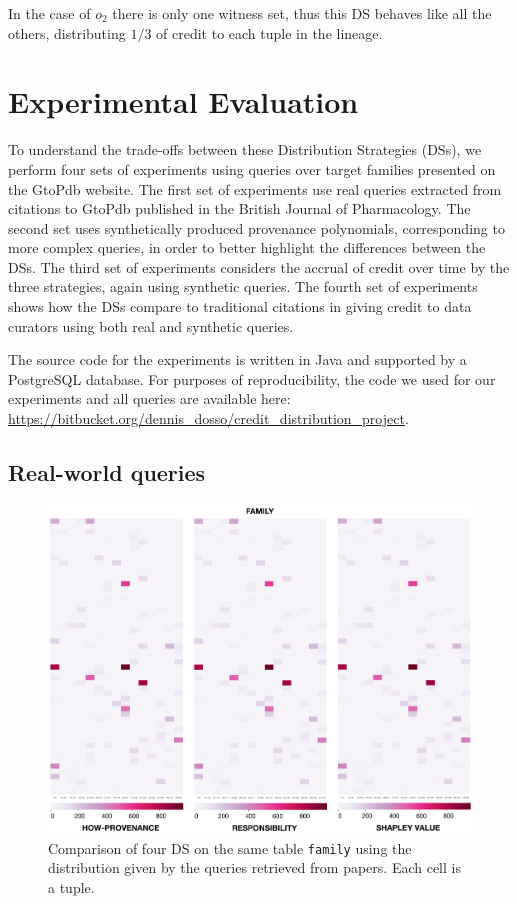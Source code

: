 \documentclass[preprint,12pt,sort&compress]{elsarticle}
\begin{document}
In the case of $o_2$ there is only one witness set, thus this DS behaves like all the others, distributing $1/3$ of credit to each tuple in the lineage. 

\section{Experimental Evaluation}
\label{sec:experiments}
To understand the trade-offs between these Distribution Strategies (DSs), we perform four sets of experiments using queries over target families presented on the GtoPdb website. The first set of experiments use real queries extracted from citations to GtoPdb published in the British Journal of Pharmacology.  
The second set uses synthetically produced provenance polynomials, corresponding to more complex queries, in order to better highlight the differences between the DSs.
The third set of experiments considers the accrual of credit over time by the three strategies, again using synthetic queries.
The fourth set of experiments shows how the DSs compare to traditional citations in giving credit to data curators using both real and synthetic queries.

The source code for the experiments is written in Java and supported by a PostgreSQL database. For purposes of reproducibility, the code we used for our experiments and all queries are available here: \url{https://bitbucket.org/dennis_dosso/credit_distribution_project}.

\subsection{Real-world queries}
\label{sec:real_world_queries}

\begin{figure}[t]
\centering
  \includegraphics[width=\textwidth]{paper_based}
  \caption{Comparison of four DS on the same table \texttt{family} using the distribution given by the queries retrieved from papers. Each cell is a tuple.}
  \label{figure:comparison_on_papers}
\end{figure}
\end{document}

